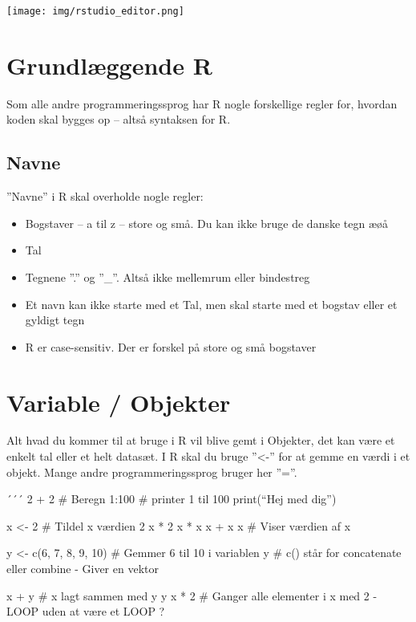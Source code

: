 \documentclass[
]{book}
\providecommand{\tightlist}{%
  \setlength{\itemsep}{0pt}\setlength{\parskip}{0pt}}
\begin{document}
\texttt{[image: img/rstudio\_editor.png]}

\hypertarget{grund}{%
\chapter{Grundlæggende R}\label{grund}}

Som alle andre programmeringssprog har R nogle forskellige regler for, hvordan koden skal bygges op -- altså syntaksen for R.

\hypertarget{navne}{%
\section{Navne}\label{navne}}

''Navne'' i R skal overholde nogle regler:

\begin{itemize}
\tightlist
\item
  Bogstaver -- a til z -- store og små. Du kan ikke bruge de danske tegn æøå
\item
  Tal
\item
  Tegnene ''.'' og ''\_''. Altså ikke mellemrum eller bindestreg
\item
  Et navn kan ikke starte med et Tal, men skal starte med et bogstav eller et gyldigt tegn
\item
  R er case-sensitiv. Der er forskel på store og små bogstaver
\end{itemize}

\hypertarget{variable-objekter}{%
\chapter{Variable / Objekter}\label{variable-objekter}}

Alt hvad du kommer til at bruge i R vil blive gemt i Objekter, det kan være et enkelt tal eller et helt datasæt.
I R skal du bruge ''\textless-'' for at gemme en værdi i et objekt. Mange andre programmeringssprog bruger her ''=''.

´´´
2 + 2 \# Beregn
1:100 \# printer 1 til 100
print(``Hej med dig'')

x \textless- 2 \# Tildel x værdien 2
x * 2
x * x
x + x
x \# Viser værdien af x

y \textless- c(6, 7, 8, 9, 10) \# Gemmer 6 til 10 i variablen y
\# c() står for concatenate eller combine - Giver en vektor

x + y \# x lagt sammen med y
y
x * 2 \# Ganger alle elementer i x med 2 - LOOP uden at være et LOOP ?
\end{document}
